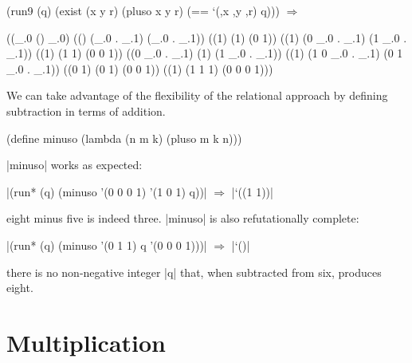 \newpage

\begin{schemedisplay}
(run9 (q)
  (exist (x y r)
    (pluso x y r)
    (== `(,x ,y ,r) q))) $\Rightarrow$
\end{schemedisplay}
\nspace
\begin{schemeresponse}
((_.0 () _.0)
 (() (_.0 . _.1) (_.0 . _.1))
 ((1) (1) (0 1))
 ((1) (0 _.0 . _.1) (1 _.0 . _.1))
 ((1) (1 1) (0 0 1))
 ((0 _.0 . _.1) (1) (1 _.0 . _.1))
 ((1) (1 0 _.0 . _.1) (0 1 _.0 . _.1))
 ((0 1) (0 1) (0 0 1))
 ((1) (1 1 1) (0 0 0 1)))
\end{schemeresponse}

We can take advantage of the flexibility of the relational approach by
defining subtraction in terms of addition.

\schemedisplayspace
\begin{schemedisplay}
(define minuso (lambda (n m k) (pluso m k n)))
\end{schemedisplay}

\noindent \scheme|minuso| works as expected: 

\wspace

\noindent\scheme|(run* (q) (minuso '(0 0 0 1) '(1 0 1) q))| $\Rightarrow$ \scheme|`((1 1))|

\wspace

\noindent eight minus five is indeed three. \scheme|minuso| is also
refutationally complete:

\wspace

\noindent\scheme|(run* (q) (minuso '(0 1 1) q '(0 0 0 1)))| $\Rightarrow$ \scheme|`()|

\wspace

\noindent there is no non-negative integer \scheme|q| that, when
subtracted from six, produces eight.

\section{Multiplication}\label{arithmult}
\enlargethispage{2em}


